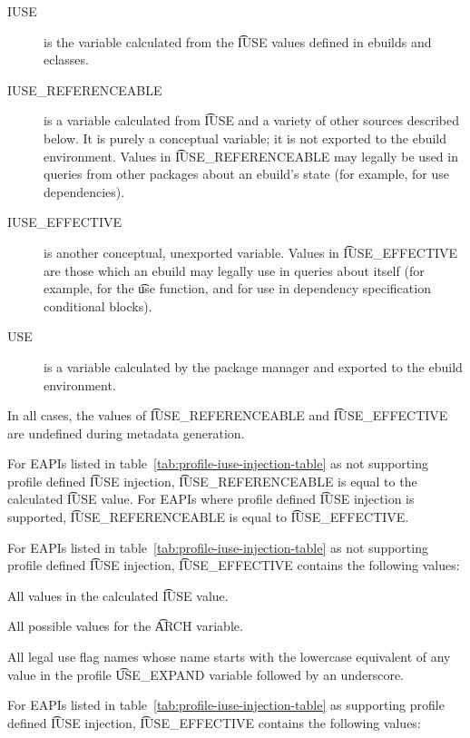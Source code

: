 \begin{description}
\item[IUSE] is the variable calculated from the \t{IUSE} values defined in ebuilds and eclasses.
\item[IUSE\_REFERENCEABLE] is a variable calculated from \t{IUSE} and a variety of other sources
    described below. It is purely a conceptual variable; it is not exported to the ebuild
    environment. Values in \t{IUSE\_REFERENCEABLE} may legally be used in queries from other
    packages about an ebuild's state (for example, for use dependencies).
\item[IUSE\_EFFECTIVE] is another conceptual, unexported variable. Values in \t{IUSE\_EFFECTIVE} are
    those which an ebuild may legally use in queries about itself (for example, for the \t{use}
    function, and for use in dependency specification conditional blocks).
\item[USE] is a variable calculated by the package manager and exported to the ebuild environment.
\end{description}

In all cases, the values of \t{IUSE\_REFERENCEABLE} and \t{IUSE\_EFFECTIVE} are undefined during
metadata generation.

For EAPIs listed in table~\ref{tab:profile-iuse-injection-table} as not supporting profile defined
\t{IUSE} injection, \t{IUSE\_REFERENCEABLE} is equal to the calculated \t{IUSE} value. For EAPIs
where profile defined \t{IUSE} injection is supported, \t{IUSE\_REFERENCEABLE} is equal to
\t{IUSE\_EFFECTIVE}.

For EAPIs listed in table~\ref{tab:profile-iuse-injection-table} as not supporting profile defined
\t{IUSE} injection, \t{IUSE\_EFFECTIVE} contains the following values:

\begin{compactitem}
\item All values in the calculated \t{IUSE} value.
\item All possible values for the \t{ARCH} variable.
\item All legal use flag names whose name starts with the lowercase equivalent of any value in
    the profile \t{USE\_EXPAND} variable followed by an underscore.
\end{compactitem}

 For EAPIs listed in
table~\ref{tab:profile-iuse-injection-table} as supporting profile defined \t{IUSE} injection,
\t{IUSE\_EFFECTIVE} contains the following values:

